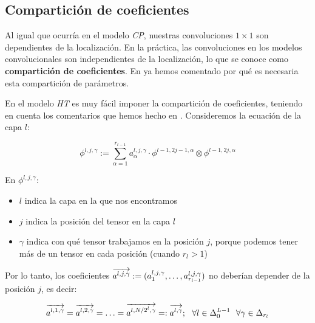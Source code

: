 



\subsection{Compartición de coeficientes}

Al igual que ocurría en el modelo \textit{CP}, nuestras convoluciones $1 \times 1$ son dependientes de la localización. En la práctica, las convoluciones en los modelos convolucionales son independientes de la localización, lo que se conoce como \textbf{compartición de coeficientes}. En  ya hemos comentado por qué es necesaria esta compartición de parámetros.

En el modelo \textit{HT} es muy fácil imponer la compartición de coeficientes, teniendo en cuenta los comentarios que hemos hecho en . Consideremos la ecuación de la capa $l$:

\begin{equation}
    \phi^{l, j, \gamma} := \sum_{\alpha = 1}^{r_{l-1}} a_{\alpha}^{l, j, \gamma} \cdot \phi^{l-1, 2j-1, \alpha} \otimes \phi^{l-1, 2j, \alpha}
\end{equation}

En $\phi^{l, j, \gamma}$:

\begin{itemize}
    \item $l$ indica la capa en la que nos encontramos
    \item $j$ indica la posición del tensor en la capa $l$
    \item $\gamma$ indica con qué tensor trabajamos en la posición $j$, porque podemos tener más de un tensor en cada posición (cuando $r_l > 1$)
\end{itemize}

Por lo tanto, los coeficientes $\overrightarrow{a^{l, j, \gamma}} := (a^{l, j, \gamma}_1, \ldots, a^{l, j, \gamma}_{r_{l-1}})$ no deberían depender de la posición $j$, es decir:

\begin{equation}
    \overrightarrow{a^{l, 1, \gamma}} = \overrightarrow{a^{l, 2, \gamma}} = \ldots = \overrightarrow{a^{l, N/2^l, \gamma}} =: \overrightarrow{a^{l, \gamma}}; \ \  \forall l \in \Delta_{0}^{L - 1} \ \  \forall \gamma \in \Delta_{r_l}
\end{equation}


